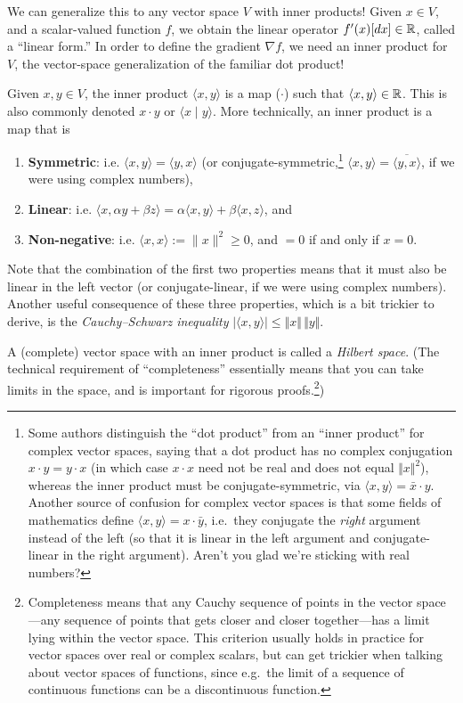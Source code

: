 We can generalize this to any vector space $V$ with inner products! Given $x\in V$, and a scalar-valued function $f$, we obtain the linear operator $f'(x) [d x] \in \mathbb R$, called a ``linear form.'' In order to define the gradient $\nabla f$, we need an inner product for $V$, the vector-space generalization of the familiar dot product!

Given $x,y \in V$, the inner product $\langle x, y \rangle$  is a map ($\cdot$) such that $\langle x, y \rangle \in \mathbb R$. This is also commonly denoted $x \cdot y$ or $\langle x \mid y \rangle$. More technically, an inner product is a map  that is 
\begin{enumerate}
    \item \textbf{Symmetric}: i.e. $\langle x, y \rangle = \langle y, x \rangle$ (or conjugate-symmetric,\footnote{Some authors distinguish the ``dot product'' from an ``inner product'' for complex vector spaces, saying that a dot product has no complex conjugation $x \cdot y = y \cdot x$ (in which case $x \cdot x$ need not be real and does not equal $\Vert x \Vert^2$), whereas the inner product must be conjugate-symmetric, via $\langle x, y \rangle = \bar{x} \cdot y$.  Another source of confusion for complex vector spaces is that some fields of mathematics define $\langle x, y \rangle = x \cdot \bar{y}$, i.e.~they conjugate the \emph{right} argument instead of the left (so that it is linear in the left argument and conjugate-linear in the right argument).  Aren't you glad we're sticking with real numbers?} $\langle x, y \rangle = \overline{\langle y, x \rangle}$, if we were using complex numbers), 
    \item \textbf{Linear}: i.e. $\langle x, \alpha y + \beta z\rangle = \alpha \langle x, y \rangle + \beta \langle x, z \rangle$, and 
    \item \textbf{Non-negative}: i.e. $\langle x, x \rangle := \lVert x \rVert^2 \geq 0$, and $=0$ if and only if $x = 0$.
\end{enumerate}
Note that the combination of the first two properties means that it must also be linear in the left vector (or conjugate-linear, if we were using complex numbers).  Another useful consequence of these three properties, which is a bit trickier to derive, is the \emph{Cauchy--Schwarz inequality} $|\langle x, y \rangle| \le \Vert x \Vert \, \Vert y \Vert$.

\begin{definition}
A (complete) vector space with an inner product is called a \textit{Hilbert space}.  (The technical requirement of ``completeness'' essentially means that you can take limits in the space, and is important for rigorous proofs.\footnote{Completeness means that any Cauchy sequence of points in the vector space---any sequence of points that gets closer and closer together---has a limit lying within the vector space.  This criterion usually holds in practice for vector spaces over real or complex scalars, but can get trickier when talking about vector spaces of functions, since e.g.~the limit of a sequence of continuous functions can be a discontinuous function.})
\end{definition}

